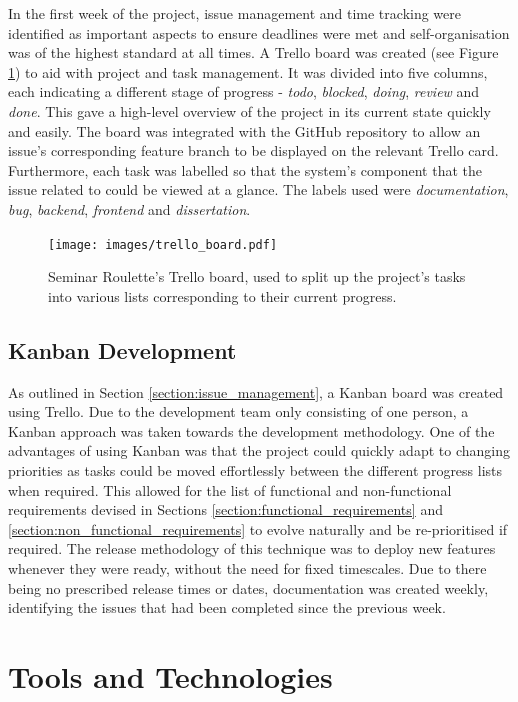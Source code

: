 \documentclass{l4proj}
\begin{document}
In the first week of the project, issue management and time tracking were identified as important aspects to ensure deadlines were met and self-organisation was of the highest standard at all times. A Trello board \citep{trello} was created (see Figure \ref{fig:trello_board}) to aid with project and task management. It was divided into five columns, each indicating a different stage of progress - \emph{todo}, \emph{blocked}, \emph{doing}, \emph{review} and \emph{done}. This gave a high-level overview of the project in its current state quickly and easily. The board was integrated with the GitHub repository to allow an issue's corresponding feature branch to be displayed on the relevant Trello card. Furthermore, each task was labelled so that the system's component that the issue related to could be viewed at a glance. The labels used were \emph{documentation}, \emph{bug}, \emph{backend}, \emph{frontend} and \emph{dissertation}.

\begin{figure}[htb]
    \centering
    \texttt{[image: images/trello\_board.pdf]}    
    \caption{Seminar Roulette's Trello board, used to split up the project's tasks into various lists corresponding to their current progress.}
    \label{fig:trello_board} 
\end{figure}

\subsection{Kanban Development}

As outlined in Section \ref{section:issue_management}, a Kanban board was created using Trello. Due to the development team only consisting of one person, a Kanban approach was taken towards the development methodology. One of the advantages of using Kanban was that the project could quickly adapt to changing priorities as tasks could be moved effortlessly between the different progress lists when required. This allowed for the list of functional and non-functional requirements devised in Sections \ref{section:functional_requirements} and \ref{section:non_functional_requirements} to evolve naturally and be re-prioritised if required. The release methodology of this technique was to deploy new features whenever they were ready, without the need for fixed timescales. Due to there being no prescribed release times or dates, documentation was created weekly, identifying the issues that had been completed since the previous week.

\section{Tools and Technologies}
\label{section:tools_and_technologies}
\end{document}
